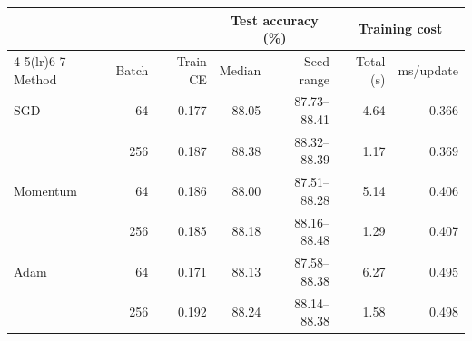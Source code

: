 \begin{tabular}{@{}lrrrrrr@{}}
\toprule
 & & & \multicolumn{2}{c}{Test accuracy (\%)} & \multicolumn{2}{c}{Training cost} \\
\cmidrule(lr){4-5}\cmidrule(lr){6-7}
Method & Batch & Train CE & Median & Seed range & Total (s) & ms/update \\
\midrule
SGD & 64 & 0.177 & 88.05 & 87.73--88.41 & 4.64 & 0.366 \\
 & 256 & 0.187 & 88.38 & 88.32--88.39 & 1.17 & 0.369 \\
\addlinespace[2pt]
Momentum & 64 & 0.186 & 88.00 & 87.51--88.28 & 5.14 & 0.406 \\
 & 256 & 0.185 & 88.18 & 88.16--88.48 & 1.29 & 0.407 \\
\addlinespace[2pt]
Adam & 64 & 0.171 & 88.13 & 87.58--88.38 & 6.27 & 0.495 \\
 & 256 & 0.192 & 88.24 & 88.14--88.38 & 1.58 & 0.498 \\
\bottomrule
\end{tabular}
